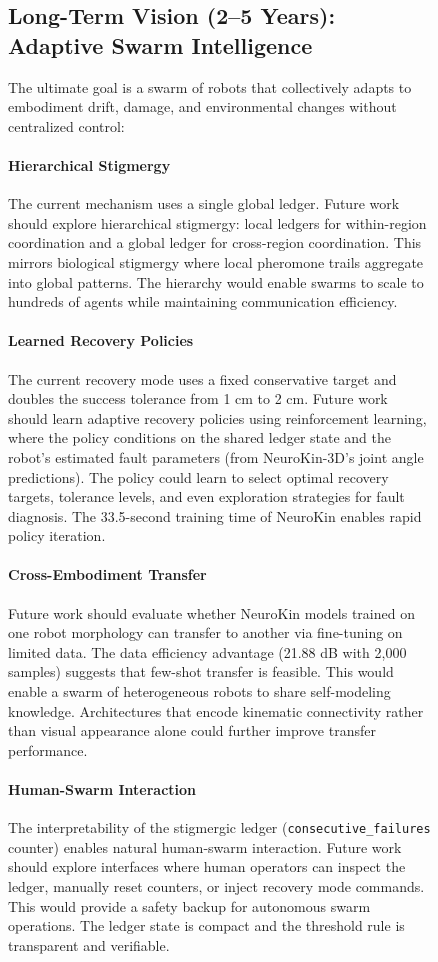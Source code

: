 \documentclass[12pt,a4paper,oneside]{report}
\begin{document}
\begin{figure}[H]
\subsection{Long-Term Vision (2--5 Years): Adaptive Swarm Intelligence}

The ultimate goal is a swarm of robots that collectively adapts to embodiment drift, damage, and environmental changes without centralized control:

\paragraph{Hierarchical Stigmergy}
The current mechanism uses a single global ledger. Future work should explore hierarchical stigmergy: local ledgers for within-region coordination and a global ledger for cross-region coordination. This mirrors biological stigmergy where local pheromone trails aggregate into global patterns. The hierarchy would enable swarms to scale to hundreds of agents while maintaining communication efficiency.

\paragraph{Learned Recovery Policies}
The current recovery mode uses a fixed conservative target and doubles the success tolerance from 1 cm to 2 cm. Future work should learn adaptive recovery policies using reinforcement learning, where the policy conditions on the shared ledger state and the robot's estimated fault parameters (from NeuroKin-3D's joint angle predictions). The policy could learn to select optimal recovery targets, tolerance levels, and even exploration strategies for fault diagnosis. The 33.5-second training time of NeuroKin enables rapid policy iteration.

\paragraph{Cross-Embodiment Transfer}
Future work should evaluate whether NeuroKin models trained on one robot morphology can transfer to another via fine-tuning on limited data. The data efficiency advantage (21.88 dB with 2,000 samples) suggests that few-shot transfer is feasible. This would enable a swarm of heterogeneous robots to share self-modeling knowledge. Architectures that encode kinematic connectivity rather than visual appearance alone could further improve transfer performance.

\paragraph{Human-Swarm Interaction}
The interpretability of the stigmergic ledger (\texttt{consecutive\_failures} counter) enables natural human-swarm interaction. Future work should explore interfaces where human operators can inspect the ledger, manually reset counters, or inject recovery mode commands. This would provide a safety backup for autonomous swarm operations. The ledger state is compact and the threshold rule is transparent and verifiable.


\end{figure}
\end{document}
